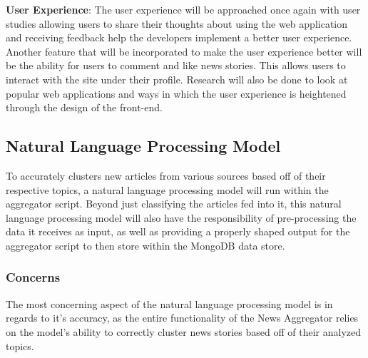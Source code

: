 \documentclass[onecolumn, draftclsnofoot,10pt, compsoc]{IEEEtran}
\begin{document}
\hangindent=0.5cm \textbf{User Experience}:
The user experience will be approached once again with user studies allowing users to share their thoughts about using the web application and receiving feedback help the developers implement a better user experience. Another feature that will be incorporated to make the user experience better will be the ability for users to comment and like news stories. This allows users to interact with the site under their profile. Research will also be done to look at popular web applications and ways in which the user experience is heightened through the design of the front-end. 


\subsection{Natural Language Processing Model}
To accurately clusters new articles from various sources based off of their respective topics, a natural language processing model will run within the aggregator script. Beyond just classifying the articles fed into it, this natural language processing model will also have the responsibility of pre-processing the data it receives as input, as well as providing a properly shaped output for the aggregator script to then store within the MongoDB data store.
\subsubsection{Concerns}
The most concerning aspect of the natural language processing model is in regards to it's accuracy, as the entire functionality of the News Aggregator relies on the model's ability to correctly cluster news stories based off of their analyzed topics.
\end{document}
